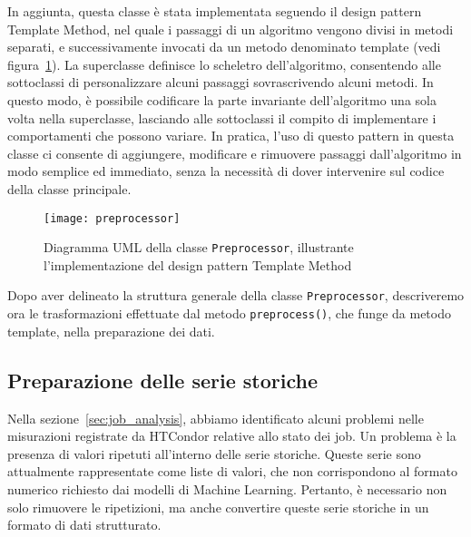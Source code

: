 
In aggiunta, questa classe è stata implementata seguendo il design pattern
Template Method, nel quale i passaggi di un algoritmo vengono divisi in metodi
separati, e successivamente invocati da un metodo denominato template (vedi
figura~\ref{fig:uml_preprocessor}). La superclasse definisce lo scheletro
dell'algoritmo, consentendo alle sottoclassi di personalizzare alcuni passaggi
sovrascrivendo alcuni metodi. In questo modo, è possibile codificare la parte
invariante dell'algoritmo una sola volta nella superclasse, lasciando alle
sottoclassi il compito di implementare i comportamenti che possono variare. In
pratica, l'uso di questo pattern in questa classe ci consente di aggiungere,
modificare e rimuovere passaggi dall'algoritmo in modo semplice ed immediato,
senza la necessità di dover intervenire sul codice della classe principale.

\begin{figure}[!ht]
   \centering
   \texttt{[image: preprocessor]}
   \caption{Diagramma UML della classe \texttt{Preprocessor}, illustrante
   l'implementazione del design pattern Template Method}
   \label{fig:uml_preprocessor}
\end{figure}

Dopo aver delineato la struttura generale della classe \texttt{Preprocessor},
descriveremo ora le trasformazioni effettuate dal metodo
\texttt{preprocess()}, che funge da metodo template, nella preparazione dei
dati.

\subsection{Preparazione delle serie storiche}

Nella sezione~\ref{sec:job_analysis}, abbiamo identificato alcuni problemi
nelle misurazioni registrate da HTCondor relative allo stato dei job. Un
problema è la presenza di valori ripetuti all'interno delle serie storiche.
Queste serie sono attualmente rappresentate come liste di valori, che non
corrispondono al formato numerico richiesto dai modelli di Machine Learning.
Pertanto, è necessario non solo rimuovere le ripetizioni, ma anche convertire
queste serie storiche in un formato di dati strutturato.

